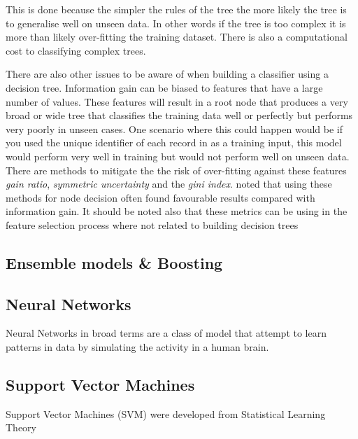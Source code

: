 This is done because the simpler the rules of the tree the more likely the tree is to generalise well on unseen data. In other words if the tree is too complex it is more than likely over-fitting the training dataset. There is also a computational cost to classifying complex trees. 

There are also other issues to be aware of when building a classifier using a decision tree. Information gain can be biased to features that have a large number of values. These features will result in a root node that produces a very broad or wide tree that classifies the training data well or perfectly but performs very poorly in unseen cases. One scenario where this could happen would be if you used the unique identifier of each record in as a training input, this model would perform very well in training but would not perform well on unseen data. There are methods to mitigate the the risk of over-fitting against these features \textit{gain ratio}, \textit{symmetric uncertainty} and the \textit{gini index}. \cite{quinlan_induction_1986} noted that using these methods for node decision often found favourable results compared with information gain. It should be noted also that these metrics can be using in the feature selection process where not related to building decision trees

\subsection{Ensemble models \& Boosting} \label{boosting}
\begin{comment}

In 1907, statistician Sir Francis Galton attended a fair in which there was a competition to judge the weight of an Ox. Upon reviewing the 787 predictions made by the competing public, he observed that while there was a 
\end{comment}

\subsection{Neural Networks} \label{neuralNets}
Neural Networks in broad terms are a class of model that attempt to learn patterns in data by simulating the activity in a human brain.


\subsection{Support Vector Machines} \label{SVM}
Support Vector Machines (SVM) were developed from Statistical Learning Theory 

